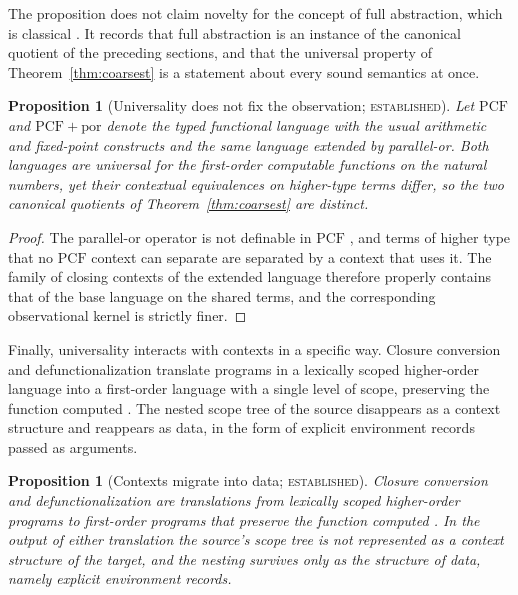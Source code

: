 \documentclass[11pt]{article}
\newtheorem{proposition}[theorem]{Proposition}
\theoremstyle{definition}
\theoremstyle{remark}
\newcommand{\stE}{\textsc{established}}
\begin{document}
The proposition does not claim novelty for the concept of full abstraction, which is classical \cite{plotkin}. It records that full abstraction is an instance of the canonical quotient of the preceding sections, and that the universal property of Theorem~\ref{thm:coarsest} is a statement about every sound semantics at once.

\begin{proposition}[Universality does not fix the observation; \stE]\label{prop:univinsufficient}
Let $\mathrm{PCF}$ and $\mathrm{PCF}+\mathrm{por}$ denote the typed functional language with the usual arithmetic and fixed-point constructs and the same language extended by parallel-or. Both languages are universal for the first-order computable functions on the natural numbers, yet their contextual equivalences on higher-type terms differ, so the two canonical quotients of Theorem~\ref{thm:coarsest} are distinct.
\end{proposition}
\begin{proof}
The parallel-or operator is not definable in $\mathrm{PCF}$ \cite{plotkin}, and terms of higher type that no $\mathrm{PCF}$ context can separate are separated by a context that uses it. The family of closing contexts of the extended language therefore properly contains that of the base language on the shared terms, and the corresponding observational kernel is strictly finer.
\end{proof}

Finally, universality interacts with contexts in a specific way. Closure conversion and defunctionalization translate programs in a lexically scoped higher-order language into a first-order language with a single level of scope, preserving the function computed \cite{reynolds,minamide}. The nested scope tree of the source disappears as a context structure and reappears as data, in the form of explicit environment records passed as arguments.

\begin{proposition}[Contexts migrate into data; \stE]\label{prop:reify}
Closure conversion and defunctionalization are translations from lexically scoped higher-order programs to first-order programs that preserve the function computed \cite{reynolds,minamide}. In the output of either translation the source's scope tree is not represented as a context structure of the target, and the nesting survives only as the structure of data, namely explicit environment records.
\end{proposition}
\end{document}
